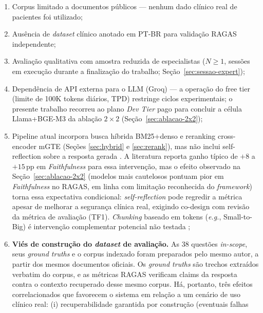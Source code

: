 \documentclass[
  12pt,
  oneside,
  a4paper,
  english,
  brazil
]{abntex2}
\begin{document}
\begin{enumerate}[label=\textbf{L\arabic*}]
  \item Corpus limitado a documentos públicos --- nenhum dado clínico real de
        pacientes foi utilizado;
  \item Ausência de \textit{dataset} clínico anotado em PT-BR para validação
        RAGAS independente;
  \item Avaliação qualitativa com amostra reduzida de especialistas
        ($N \geq 1$, sessões em execução durante a finalização do
        trabalho; Seção~\ref{sec:sessao-expert});
  \item Dependência de API externa para o LLM (Groq) --- a operação do
        free tier (limite de 100K tokens diários, TPD) restringe
        ciclos experimentais; o presente trabalho recorreu ao plano
        \textit{Dev Tier} pago para concluir a célula Llama+BGE-M3 da
        ablação $2 \times 2$ (Seção~\ref{sec:ablacao-2x2});
  \item Pipeline atual incorpora busca híbrida BM25+denso e
        reranking cross-encoder mGTE (Seções
        \ref{sec:hybrid} e \ref{sec:rerank}), mas não inclui
        self-reflection sobre a resposta gerada
        \cite{jeong2024selfbiorag}. A literatura reporta ganho típico de
        $+8$ a $+15$\,pp em \textit{Faithfulness} para essa intervenção,
        mas o efeito observado na Seção~\ref{sec:ablacao-2x2} (modelos
        mais cautelosos pontuam pior em \textit{Faithfulness} no RAGAS,
        em linha com limitação reconhecida do \emph{framework}) torna
        essa expectativa condicional: \textit{self-reflection} pode
        regredir a métrica apesar de melhorar a segurança clínica real,
        exigindo co-design com revisão da métrica de avaliação (TF1).
        \textit{Chunking} baseado em tokens (\textit{e.g.}, Small-to-Big) é
        intervenção complementar potencial não testada
        \cite{advancedChunkingRAG2025};
  \item \textbf{Viés de construção do \textit{dataset} de avaliação.}
        As 38 questões \textit{in-scope}, seus \textit{ground truths}
        e o corpus indexado foram preparados pelo mesmo autor, a partir
        dos mesmos documentos oficiais. Os \textit{ground truths} são
        trechos extraídos verbatim do corpus, e as métricas RAGAS verificam
        claims da resposta contra o contexto recuperado desse
        mesmo corpus. Há, portanto, três efeitos correlacionados que
        favorecem o sistema em relação a um cenário de uso clínico real:
        (i) recuperabilidade garantida por construção (eventuais falhas

\end{enumerate}
\end{document}
